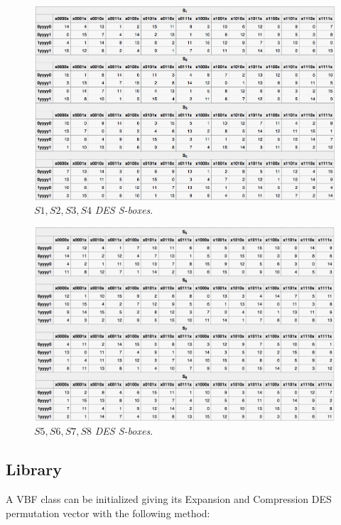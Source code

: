 \begin{enumerate}
\begin{figure}[htbp!]
\centering
\includegraphics[width=1.0\textwidth]{S1-4}
\caption[$S1,S2,S3,S4$ DES S-boxes]{$S1,S2,S3,S4$ \textit{DES S-boxes}.}
\label{fig:S1-4}
\end{figure}

\begin{figure}[htbp!]
\centering
\includegraphics[width=1.0\textwidth]{S5-8}
\caption[$S5,S6,S7,S8$ DES S-boxes]{$S5,S6,S7,S8$ \textit{DES S-boxes}.}
\label{fig:S5-8}
\end{figure}

\end{enumerate}

\subsection{Library}

A VBF class can be initialized giving its Expansion and Compression DES permutation vector with the following method:

